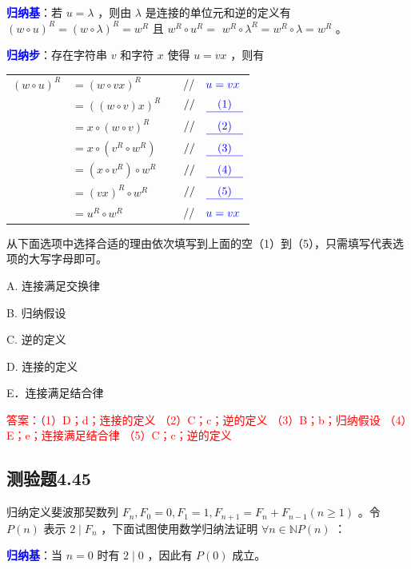 \documentclass[UTF8, heading=true]{ctexart}
\begin{document}
\textcolor{blue}{\textbf{归纳基}}：若 $u=\lambda$ ，则由 $\lambda$ 是连接的单位元和逆的定义有 $(w \circ u)^R=(w \circ \lambda)^R=w^R$ 且 $w^R \circ u^R=$ $w^R \circ \lambda^R=w^R \circ \lambda=w^R$ 。

\textcolor{blue}{\textbf{归纳步}}：存在字符串 $v$ 和字符 $x$ 使得 $u=v x$ ，则有


\begin{table}[H]
  \renewcommand{\arraystretch}{1.5}
  \centering
\begin{tabular}{rlrl}
  $(w \circ u)^R$ & $=(w \circ v x)^R$ & & $/ / \quad \textcolor{blue}{u = v x}$ \\
  & $=((w \circ v) x)^R$ & & $/ / \quad \textcolor{blue}{\underline{\quad (1) \quad}}$ \\
  & $=x \circ(w \circ v)^R$ & & $/ / \quad \textcolor{blue}{\underline{\quad (2) \quad}}$ \\
  & $=x \circ\left(v^R \circ w^R\right)$ & & $/ / \quad \textcolor{blue}{\underline{\quad (3) \quad}}$ \\
  & $=\left(x \circ v^R\right) \circ w^R$ & & $/ / \quad \textcolor{blue}{\underline{\quad (4) \quad}}$ \\
  & $=(v x)^R \circ w^R$ & & $/ / \quad \textcolor{blue}{\underline{\quad (5) \quad}}$ \\
  & $=u^R \circ w^R$ & & $/ / \quad \textcolor{blue}{u = v x}$
\end{tabular}
\end{table}


从下面选项中选择合适的理由依次填写到上面的空（1）到（5），只需填写代表选项的大写字母即可。

A. 连接满足交换律

B. 归纳假设

C. 逆的定义

D. 连接的定义

E．连接满足结合律

\textcolor{red}{答案：（1）D；d；连接的定义
（2）C；c；逆的定义
（3）B；b；归纳假设
（4）E；e；连接满足结合律
（5）C；c；逆的定义}


\subsection{测验题4.45}

归纳定义斐波那契数列 $F_n, F_0=0, F_1=1, F_{n+1}=F_n+F_{n-1}(n \geq 1)$ 。令 $P(n)$ 表示 $2 \mid F_n$ ，下面试图使用数学归纳法证明 $\forall n \in \mathbb{N} P(n)$ ：

\textcolor{blue}{\textbf{归纳基}}：当 $n=0$ 时有 $2 \mid 0$ ，因此有 $P(0)$ 成立。
\end{document}
